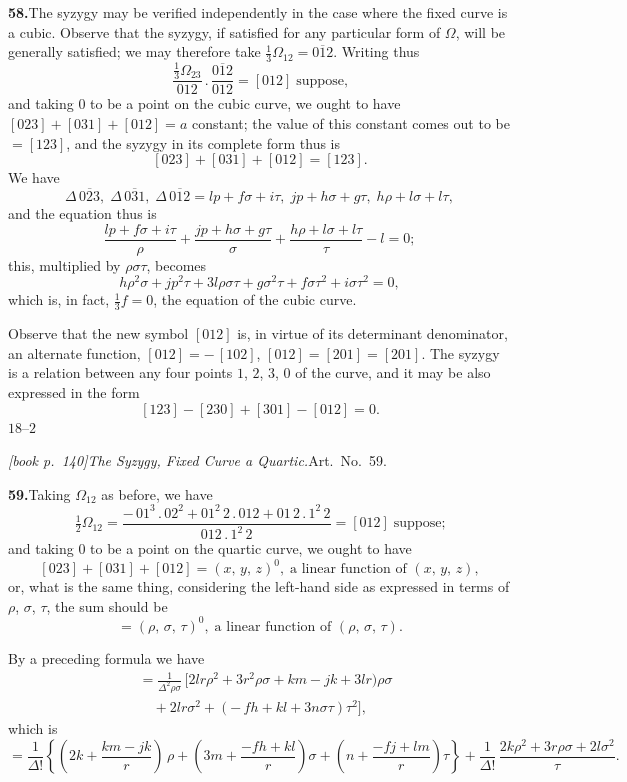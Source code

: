 \documentclass[11pt,a4paper]{article}
\theoremstyle{plain}
\theoremstyle{definition}
\theoremstyle{remark}
\providecommand{\bdet}[1]{\overline{#1}}
\begin{document}
\medskip\noindent\textbf{58.}\quad The syzygy may be verified independently in the case where the fixed curve is a cubic. Observe that the syzygy, if satisfied for any particular form of $\Omega$, will be generally satisfied; we may therefore take $\tfrac{1}{3}\Omega_{12} = \bdet{012}$. Writing thus
\[
\frac{\tfrac{1}{3}\Omega_{23}}{012}\,.\,\frac{\bdet{012}}{012} = [012]\;\text{suppose,}
\]
and taking $0$ to be a point on the cubic curve, we ought to have $[023] + [031] + [012] = a$ constant; the value of this constant comes out to be $= [123]$, and the syzygy in its complete form thus is
\[
[023] + [031] + [012] = [123].
\]
We have
\[
\Delta\,\bdet{023},\;\Delta\,\bdet{031},\;\Delta\,\bdet{012} = lp + f\sigma + i\tau,\;jp + h\sigma + g\tau,\;h\rho + l\sigma + l\tau,
\]
and the equation thus is
\[
\frac{lp + f\sigma + i\tau}{\rho} + \frac{jp + h\sigma + g\tau}{\sigma} + \frac{h\rho + l\sigma + l\tau}{\tau} - l = 0;
\]
this, multiplied by $\rho\sigma\tau$, becomes
\[
h\rho^{2}\sigma + jp^{2}\tau + 3l\rho\sigma\tau + g\sigma^{2}\tau + f\sigma\tau^{2} + i\sigma\tau^{2} = 0,
\]
which is, in fact, $\tfrac{1}{3}f = 0$, the equation of the cubic curve.

Observe that the new symbol $[012]$ is, in virtue of its determinant denominator, an alternate function, $[012] = -\,[102]$, $[012] = [201] = [201]$. The syzygy is a relation between any four points $1$, $2$, $3$, $0$ of the curve, and it may be also expressed in the form
\[
[123] - [230] + [301] - [012] = 0.
\]
\hfill $18$--$2$

\medskip\noindent\textit{[book p.~140]}\quad \textit{The Syzygy, Fixed Curve a Quartic.}\quad Art.\ No.\ 59.

\medskip\noindent\textbf{59.}\quad Taking $\Omega_{12}$ as before, we have
\[
\tfrac{1}{2}\Omega_{12} = \frac{-\,01^{3}\,.\,02^{2} + 01^{2}\,2\,.\,012 + 01\,2\,.\,1^{2}\,2}{012\,.\,1^{2}\,2} = [012]\;\text{suppose;}
\]
and taking $0$ to be a point on the quartic curve, we ought to have
\[
[023] + [031] + [012] = (x,\,y,\,z)^{0},\;\text{a linear function of }(x,\,y,\,z),
\]
or, what is the same thing, considering the left-hand side as expressed in terms of $\rho$, $\sigma$, $\tau$, the sum should be
\[
= (\rho,\,\sigma,\,\tau)^{0},\;\text{a linear function of }(\rho,\,\sigma,\,\tau).
\]

By a preceding formula we have
\begin{align*}
[0\,1\,2] &= \frac{1}{\Delta^{2}\rho\sigma}\,\bigl[2lr\rho^{2} + 3r^{2}\rho\sigma + km - jk + 3lr)\rho\sigma\\
&\quad + 2lr\sigma^{2} + (-\,fh + kl + 3n\sigma\tau)\tau^{2}\bigr],
\end{align*}
which is
\[
= \frac{1}{\Delta!}\left\{(2k + \frac{km - jk}{r})\,\rho + \left(3m + \frac{-fh + kl}{r}\right)\sigma + \left(n + \frac{-fj + lm}{r}\right)\tau\right\} + \frac{1}{\Delta!}\,\frac{2k\rho^{2} + 3r\rho\sigma + 2l\sigma^{2}}{\tau}.
\]
\end{document}
